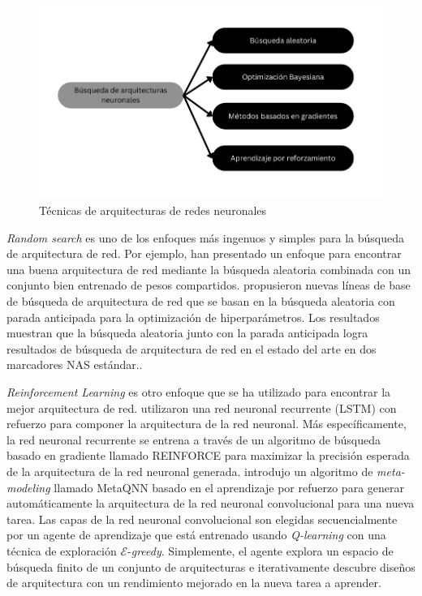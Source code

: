 \begin{figure}[H]
    \center 
    \includegraphics[scale=0.4]{images/NAS.png}
    \caption{Técnicas de arquitecturas de redes neuronales}
\end{figure}

\textit{Random search} es uno de los enfoques más ingenuos y simples para la búsqueda de arquitectura de red. Por ejemplo, \parencite{40} han presentado un enfoque para encontrar una buena arquitectura de red mediante la búsqueda aleatoria combinada con un conjunto bien entrenado de pesos compartidos. \parencite{41} propusieron nuevas líneas de base de búsqueda de arquitectura de red que se basan en la búsqueda aleatoria con parada anticipada para la optimización de hiperparámetros. Los resultados muestran que la búsqueda aleatoria junto con la parada anticipada logra resultados de búsqueda de arquitectura de red en el estado del arte en dos marcadores NAS estándar..

\textit{Reinforcement Learning} \parencite{42} es otro enfoque que se ha utilizado para encontrar la mejor arquitectura de red. \parencite{35} utilizaron una red neuronal recurrente (LSTM) con refuerzo para componer la arquitectura de la red neuronal. Más específicamente, la red neuronal recurrente se entrena a través de un algoritmo de búsqueda basado en gradiente llamado REINFORCE \parencite{44} para maximizar la precisión esperada de la arquitectura de la red neuronal generada. \parencite{45} introdujo un algoritmo de \textit{meta-modeling} llamado MetaQNN basado en el aprendizaje por refuerzo para generar automáticamente la arquitectura de la red neuronal convolucional para una nueva tarea. Las capas de la red neuronal convolucional son elegidas secuencialmente por un agente de aprendizaje que está entrenado usando \textit{Q-learning} con una técnica de exploración $\mathcal{E}$-\textit{greedy}. Simplemente, el agente explora un espacio de búsqueda finito de un conjunto de arquitecturas e iterativamente descubre diseños de arquitectura con un rendimiento mejorado en la nueva tarea a aprender.

